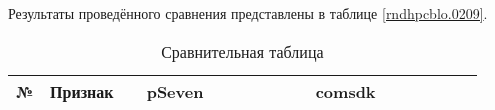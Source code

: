 Результаты проведённого сравнения представлены в таблице \ref{rndhpcblo.0209}.

\begin{landscape}
    \begin{longtable}{|p{0.03\linewidth}|p{0.2\linewidth}|p{0.35\linewidth}|p{0.35\linewidth}|}
        \caption{Сравнительная таблица}\label{rndhpcblo.020 9}                                                                                                                                                                                                                                                                                                                                                                                                                                                                                                                                                                                                                                                                                                                                                                                                                                                                                                                                                                                                           \\
        \hline
        \textbf{№} & \textbf{Признак}                                                                           & \textbf{pSeven}                                                                                                                                                                                                                                                                                                                                                                                                                                                                                                                                                                                                                                                   & \textbf{comsdk}                                                                                                                                                                                                                                                                   \\
        \hline

\end{longtable}
\end{landscape}
